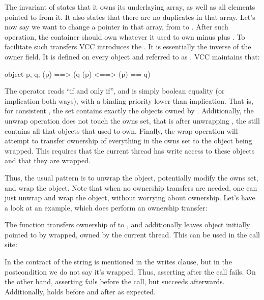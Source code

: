 \noindent
The invariant of  states that it owns its underlaying array,
as well as all elements pointed to from it.
It also states that there are no duplicates in that array.
Let's now say we want to change a pointer in that array,
from  to .
After such operation, the container should own whatever it used
to own minus  plus .
To facilitate such transfers VCC introduces the .
It is essentially the inverse of the owner field.
It is defined on every object  and referred to as .
VCC maintains that:
\begin{VCC}
\forall object p, q; \consistent(p) ==> 
  (q \in \owns(p) <==> \owner(p) == q)
\end{VCC}
The operator \vcc{<==>} reads ``if and only if'', and is simply boolean
equality (or implication both ways), with a binding priority lower than implication.
That is, for consistent , the set  contains exactly
the objects owned by .
Additionally, the unwrap operation does not touch the owns set,
that is after unwrapping , the  still contains
all that objects that  used to own.
Finally, the wrap operation will attempt to transfer ownership
of everything in the owns set to the object being wrapped.
This requires that the current thread has write access to these objects
and that they are wrapped.

Thus, the usual pattern is to unwrap the object, potentially modify the owns
set, and wrap the object.
Note that when no ownership transfers are needed, one can just unwrap
and wrap the object, without worrying about ownership.
Let's have a look at an example, which does perform an ownership transfer:


\noindent
The  function transfers ownership of  to ,
and additionally leaves object initially pointed to by 
wrapped, \ie owned by the current thread.
This can be used in the call site:


\noindent
In the contract of  the string  is mentioned
in the writes clause, but in the postcondition we do not say it's wrapped.
Thus, asserting  after the call fails.
On the other hand, asserting  fails before the call,
but succeeds afterwards.
Additionally,  holds before and after as expected.

